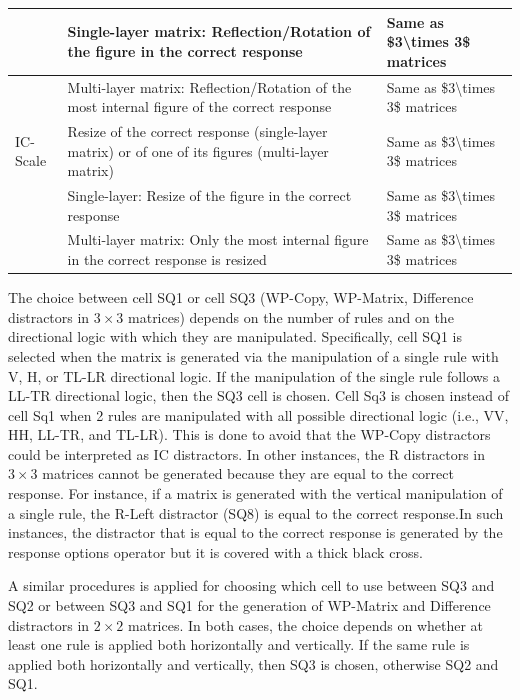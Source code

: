\begin{table}
\begin{tabular}[t]{l|l|l}
\hline
 & Single-layer matrix: Reflection/Rotation of the figure in the correct response & Same as \$3\textbackslash{}times 3\$ matrices\\
\hline
 & Multi-layer matrix: Reflection/Rotation of the most internal figure of the correct response & Same as \$3\textbackslash{}times 3\$ matrices\\
\hline
IC-Scale & Resize of the correct response (single-layer matrix) or of one of its figures (multi-layer matrix) & Same as \$3\textbackslash{}times 3\$ matrices\\
\hline
 & Single-layer: Resize of the figure in the correct response & Same as \$3\textbackslash{}times 3\$ matrices\\
\hline
 & Multi-layer matrix: Only the most internal figure in the correct response is resized & Same as \$3\textbackslash{}times 3\$ matrices\\
\hline
\end{tabular}
\end{table}

The choice between cell SQ1 or cell SQ3 (WP-Copy, WP-Matrix, Difference distractors in \(3 \times 3\) matrices) depends on the number of rules and on the directional logic with which they are manipulated.
Specifically, cell SQ1 is selected when the matrix is generated via the manipulation of a single rule with V, H, or TL-LR directional logic.
If the manipulation of the single rule follows a LL-TR directional logic, then the SQ3 cell is chosen. Cell Sq3 is chosen instead of cell Sq1 when 2 rules are manipulated with all possible directional logic (i.e., VV, HH, LL-TR, and TL-LR). This is done to avoid that the WP-Copy distractors could be interpreted as IC distractors.
In other instances, the R distractors in \(3 \times 3\) matrices cannot be generated because they are equal to the correct response. For instance, if a matrix is generated with the vertical manipulation of a single rule, the R-Left distractor (SQ8) is equal to the correct response.In such instances, the distractor that is equal to the correct response is generated by the response options operator but it is covered with a thick black cross.

A similar procedures is applied for choosing which cell to use between SQ3 and SQ2 or between SQ3 and SQ1 for the generation of WP-Matrix and Difference distractors in \(2 \times 2\) matrices. In both cases, the choice depends on whether at least one rule is applied both horizontally and vertically. If the same rule is applied both horizontally and vertically, then SQ3 is chosen, otherwise SQ2 and SQ1.

